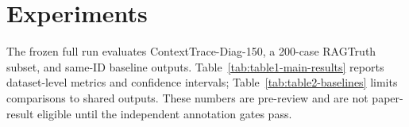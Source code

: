 \section{Experiments}
The frozen full run evaluates ContextTrace-Diag-150, a 200-case RAGTruth subset,
and same-ID baseline outputs. Table~\ref{tab:table1-main-results} reports dataset-level
metrics and confidence intervals; Table~\ref{tab:table2-baselines} limits comparisons
to shared outputs. These numbers are pre-review and are not paper-result
eligible until the independent annotation gates pass.



